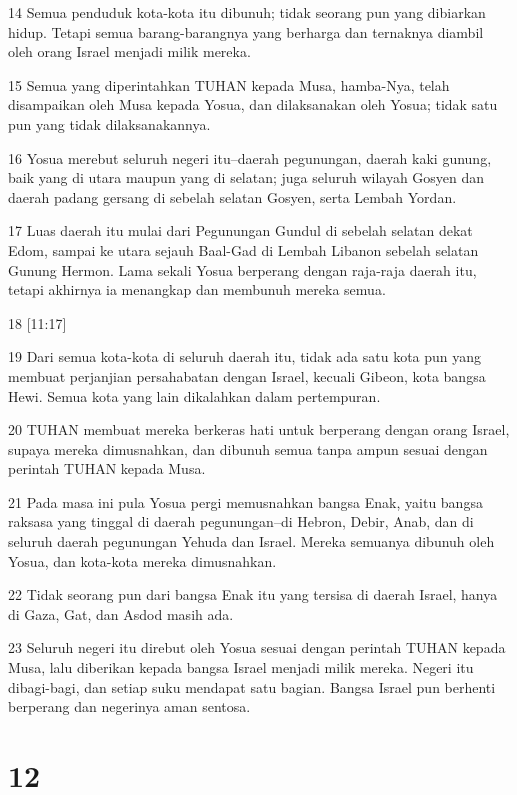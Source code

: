 \par 14 Semua penduduk kota-kota itu dibunuh; tidak seorang pun yang dibiarkan hidup. Tetapi semua barang-barangnya yang berharga dan ternaknya diambil oleh orang Israel menjadi milik mereka.
\par 15 Semua yang diperintahkan TUHAN kepada Musa, hamba-Nya, telah disampaikan oleh Musa kepada Yosua, dan dilaksanakan oleh Yosua; tidak satu pun yang tidak dilaksanakannya.
\par 16 Yosua merebut seluruh negeri itu--daerah pegunungan, daerah kaki gunung, baik yang di utara maupun yang di selatan; juga seluruh wilayah Gosyen dan daerah padang gersang di sebelah selatan Gosyen, serta Lembah Yordan.
\par 17 Luas daerah itu mulai dari Pegunungan Gundul di sebelah selatan dekat Edom, sampai ke utara sejauh Baal-Gad di Lembah Libanon sebelah selatan Gunung Hermon. Lama sekali Yosua berperang dengan raja-raja daerah itu, tetapi akhirnya ia menangkap dan membunuh mereka semua.
\par 18 [11:17]
\par 19 Dari semua kota-kota di seluruh daerah itu, tidak ada satu kota pun yang membuat perjanjian persahabatan dengan Israel, kecuali Gibeon, kota bangsa Hewi. Semua kota yang lain dikalahkan dalam pertempuran.
\par 20 TUHAN membuat mereka berkeras hati untuk berperang dengan orang Israel, supaya mereka dimusnahkan, dan dibunuh semua tanpa ampun sesuai dengan perintah TUHAN kepada Musa.
\par 21 Pada masa ini pula Yosua pergi memusnahkan bangsa Enak, yaitu bangsa raksasa yang tinggal di daerah pegunungan--di Hebron, Debir, Anab, dan di seluruh daerah pegunungan Yehuda dan Israel. Mereka semuanya dibunuh oleh Yosua, dan kota-kota mereka dimusnahkan.
\par 22 Tidak seorang pun dari bangsa Enak itu yang tersisa di daerah Israel, hanya di Gaza, Gat, dan Asdod masih ada.
\par 23 Seluruh negeri itu direbut oleh Yosua sesuai dengan perintah TUHAN kepada Musa, lalu diberikan kepada bangsa Israel menjadi milik mereka. Negeri itu dibagi-bagi, dan setiap suku mendapat satu bagian. Bangsa Israel pun berhenti berperang dan negerinya aman sentosa.

\chapter{12}

